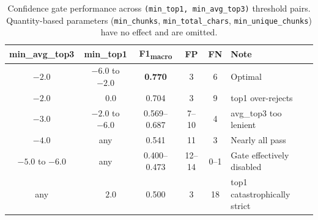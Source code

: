 
\begin{table}[htbp]
\centering
\caption{Confidence gate performance across \texttt{(min\_top1, min\_avg\_top3)} threshold pairs. Quantity-based parameters (\texttt{min\_chunks}, \texttt{min\_total\_chars}, \texttt{min\_unique\_chunks}) have no effect and are omitted.}
\label{tab:cg-threshold-landscape}
\begin{tabular}{cccccl}
\toprule
min\_avg\_top3 & min\_top1 & F1\textsubscript{macro} & FP & FN & Note \\
\midrule
$-2.0$ & $-6.0$ to $-2.0$ & \textbf{0.770} &  3 &  6 & Optimal \\
$-2.0$ & $\phantom{-}0.0$  & 0.704          &  3 &  9 & top1 over-rejects \\
$-3.0$ & $-2.0$ to $-6.0$  & 0.569--0.687   & 7--10 & 4 & avg\_top3 too lenient \\
$-4.0$ & any                & 0.541          & 11 &  3 & Nearly all pass \\
$-5.0$ to $-6.0$ & any     & 0.400--0.473   & 12--14 & 0--1 & Gate effectively disabled \\
any    & $\phantom{-}2.0$   & 0.500          &  3 & 18 & top1 catastrophically strict \\
\bottomrule
\end{tabular}
\end{table}

